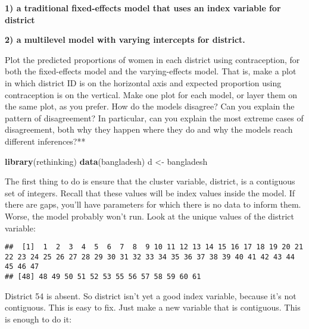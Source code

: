 \documentclass[
]{article}
\newenvironment{Shaded}{\begin{snugshade}}{\end{snugshade}}
\newcommand{\KeywordTok}[1]{\textcolor[rgb]{0.13,0.29,0.53}{\textbf{#1}}}
\newcommand{\NormalTok}[1]{#1}
\newcommand{\OperatorTok}[1]{\textcolor[rgb]{0.81,0.36,0.00}{\textbf{#1}}}
\newcommand{\StringTok}[1]{\textcolor[rgb]{0.31,0.60,0.02}{#1}}
\begin{document}
\textbf{1) a traditional fixed-effects model that uses an index variable
for district}

\textbf{2) a multilevel model with varying intercepts for district.}

Plot the predicted proportions of women in each district using
contraception, for both the fixed-effects model and the varying-effects
model. That is, make a plot in which district ID is on the horizontal
axis and expected proportion using contraception is on the vertical.
Make one plot for each model, or layer them on the same plot, as you
prefer. How do the models disagree? Can you explain the pattern of
disagreement? In particular, can you explain the most extreme cases of
disagreement, both why they happen where they do and why the models
reach different inferences?**

\begin{Shaded}
\begin{Highlighting}[]
\KeywordTok{library}\NormalTok{(rethinking)}
\KeywordTok{data}\NormalTok{(bangladesh)}
\NormalTok{d <-}\StringTok{ }\NormalTok{bangladesh}
\end{Highlighting}
\end{Shaded}

The first thing to do is ensure that the cluster variable, district, is
a contiguous set of integers. Recall that these values will be index
values inside the model. If there are gaps, you'll have parameters for
which there is no data to inform them. Worse, the model probably won't
run. Look at the unique values of the district variable:

\begin{Shaded}
\end{Shaded}

\begin{verbatim}
##  [1]  1  2  3  4  5  6  7  8  9 10 11 12 13 14 15 16 17 18 19 20 21 22 23 24 25 26 27 28 29 30 31 32 33 34 35 36 37 38 39 40 41 42 43 44 45 46 47
## [48] 48 49 50 51 52 53 55 56 57 58 59 60 61
\end{verbatim}

District 54 is absent. So district isn't yet a good index variable,
because it's not contiguous. This is easy to fix. Just make a new
variable that is contiguous. This is enough to do it:

\begin{Shaded}
\end{Shaded}
\end{document}
